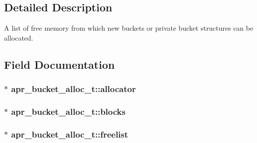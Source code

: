 \subsection{Detailed Description}
A list of free memory from which new buckets or private bucket structures can be allocated. 

\subsection{Field Documentation}
\subsubsection[{\texorpdfstring{allocator}{allocator}}]{$\ast$ apr\+\_\+bucket\+\_\+alloc\+\_\+t\+::allocator}\hypertarget{structapr__bucket__alloc__t_ac1af5ffda5f17d2b26c145ecb17d9302}{}\label{structapr__bucket__alloc__t_ac1af5ffda5f17d2b26c145ecb17d9302}
\subsubsection[{\texorpdfstring{blocks}{blocks}}]{$\ast$ apr\+\_\+bucket\+\_\+alloc\+\_\+t\+::blocks}\hypertarget{structapr__bucket__alloc__t_a199c53596b0002c1be9c71550025c393}{}\label{structapr__bucket__alloc__t_a199c53596b0002c1be9c71550025c393}
\subsubsection[{\texorpdfstring{freelist}{freelist}}]{$\ast$ apr\+\_\+bucket\+\_\+alloc\+\_\+t\+::freelist}\hypertarget{structapr__bucket__alloc__t_a19eb6c76092973a9a96953e298498d90}{}\label{structapr__bucket__alloc__t_a19eb6c76092973a9a96953e298498d90}
